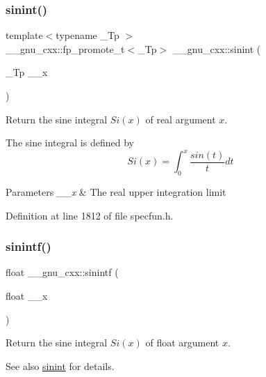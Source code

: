 \subsubsection{\texorpdfstring{sinint()}{sinint()}}
{\footnotesize\ttfamily template$<$typename \+\_\+\+Tp $>$ \\
\+\_\+\+\_\+gnu\+\_\+cxx\+::fp\+\_\+promote\+\_\+t$<$\+\_\+\+Tp$>$ \+\_\+\+\_\+gnu\+\_\+cxx\+::sinint (\begin{DoxyParamCaption}\item[{\+\_\+\+Tp}]{\+\_\+\+\_\+x }\end{DoxyParamCaption})\hspace{0.3cm}{\ttfamily [inline]}}

Return the sine integral $ Si(x) $ of real argument $ x $.

The sine integral is defined by \[ Si(x) = \int_0^x \frac{sin(t)}{t}dt \]


\begin{DoxyParams}{Parameters}
{\em \+\_\+\+\_\+x} & The real upper integration limit \\
\hline
\end{DoxyParams}


Definition at line 1812 of file specfun.\+h.

\mbox{\label{group__gnu__math__spec__func_ga8b63406fec50d7e00470521b82fb32a2}} 
\subsubsection{\texorpdfstring{sinintf()}{sinintf()}}
{\footnotesize\ttfamily float \+\_\+\+\_\+gnu\+\_\+cxx\+::sinintf (\begin{DoxyParamCaption}\item[{float}]{\+\_\+\+\_\+x }\end{DoxyParamCaption})\hspace{0.3cm}{\ttfamily [inline]}}

Return the sine integral $ Si(x) $ of {\ttfamily float} argument $ x $.

\begin{DoxySeeAlso}{See also}
\hyperlink{group__gnu__math__spec__func_ga076c8d52588904f5711c41781f8acfa0}{sinint} for details. 
\end{DoxySeeAlso}


